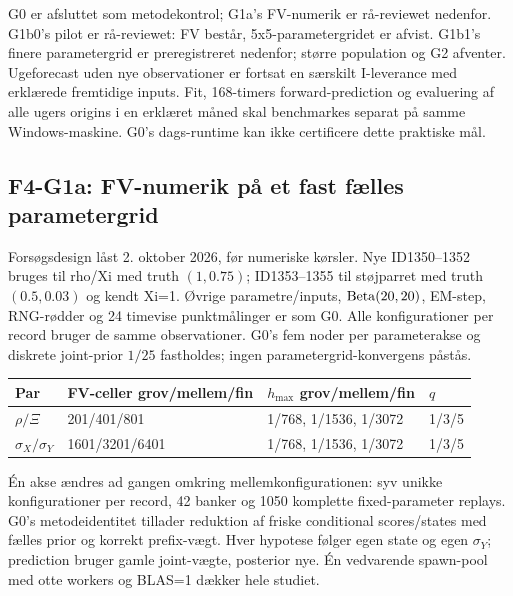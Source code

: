 G0 er afsluttet som metodekontrol; G1a's FV-numerik er rå-reviewet nedenfor.
G1b0's pilot er rå-reviewet: FV består, 5x5-parametergridet er afvist.
G1b1's finere parametergrid er preregistreret nedenfor; større population og G2 afventer.
Ugeforecast uden nye observationer er fortsat en særskilt I-leverance med
erklærede fremtidige inputs. Fit, 168-timers forward-prediction og evaluering
af alle ugers origins i en erklæret måned skal benchmarkes separat på samme
Windows-maskine. G0's dags-runtime kan ikke certificere dette praktiske mål.

\subsection{F4-G1a: FV-numerik på et fast fælles parametergrid}
Forsøgsdesign låst 2. oktober 2026, før numeriske kørsler. Nye ID1350--1352
bruges til rho/Xi med truth \((1,0.75)\); ID1353--1355 til støjparret med
truth \((0.5,0.03)\) og kendt Xi=1. Øvrige parametre/inputs, \(\operatorname{Beta}(20,20)\),
EM-step, RNG-rødder og 24 timevise punktmålinger er som G0. Alle konfigurationer
per record bruger de samme observationer. G0's fem noder per parameterakse og
diskrete joint-prior \(1/25\) fastholdes; ingen parametergrid-konvergens påstås.

\begin{center}
\begin{tabular}{llll}
\toprule
Par & FV-celler grov/mellem/fin & \(h_{\max}\) grov/mellem/fin & \(q\)\\
\midrule
\(\rho/\Xi\) & 201/401/801 & 1/768, 1/1536, 1/3072 & 1/3/5\\
\(\sigma_X/\sigma_Y\) & 1601/3201/6401 & 1/768, 1/1536, 1/3072 & 1/3/5\\
\bottomrule
\end{tabular}
\end{center}
Én akse ændres ad gangen omkring mellemkonfigurationen: syv unikke
konfigurationer per record, 42 banker og 1050 komplette fixed-parameter replays.
G0's metodeidentitet tillader reduktion af friske conditional scores/states med
fælles prior og korrekt prefix-vægt. Hver hypotese følger egen state og egen
\(\sigma_Y\); prediction bruger gamle joint-vægte, posterior nye.
Én vedvarende spawn-pool med otte workers og BLAS=1 dækker hele studiet.

